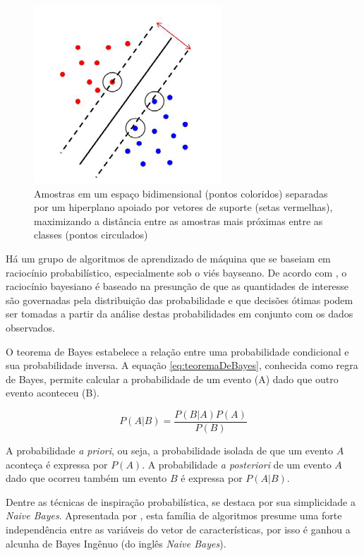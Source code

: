 \begin{figure}[h!]
  \centering
  \includegraphics[scale=0.5]{imgs/svm}
  \caption[Máquina de vetores de suporte]{Amostras em um espaço bidimensional (pontos coloridos) separadas por um hiperplano apoiado por vetores de suporte (setas vermelhas), maximizando a distância entre as amostras mais próximas entre as classes (pontos circulados)}
  \label{fig:svm}
\end{figure}


Há um grupo de algoritmos de aprendizado de máquina que se baseiam em raciocínio probabilístico, especialmente sob o viés bayseano. De acordo com , o raciocínio bayesiano é baseado na presunção de que as quantidades de interesse são governadas pela distribuição das probabilidade e que decisões ótimas podem ser tomadas a partir da análise destas probabilidades em conjunto com os dados observados.

O teorema de Bayes estabelece a relação entre uma probabilidade condicional e sua probabilidade inversa. A equação \ref{eq:teoremaDeBayes}, conhecida como regra de Bayes, permite calcular a probabilidade de um evento (A) dado que outro evento aconteceu (B).

\begin{equation}
	\displaystyle P(A|B) = \frac{P(B|A) P(A)}{P(B)}
\label{eq:teoremaDeBayes}
\end{equation}

A probabilidade \textit{a priori}, ou seja, a probabilidade isolada de que um evento $A$ aconteça é expressa por $P(A)$. A probabilidade \textit{a posteriori} de um evento $A$ dado que ocorreu também um evento $B$ é expressa por $P(A|B)$.

Dentre as técnicas de inspiração probabilística, se destaca por sua simplicidade a \textit{Naive Bayes}. Apresentada por , esta família de algoritmos presume uma forte independência entre as variáveis do vetor de características, por isso é ganhou a alcunha de Bayes Ingênuo (do inglês \textit{Naive Bayes}).

